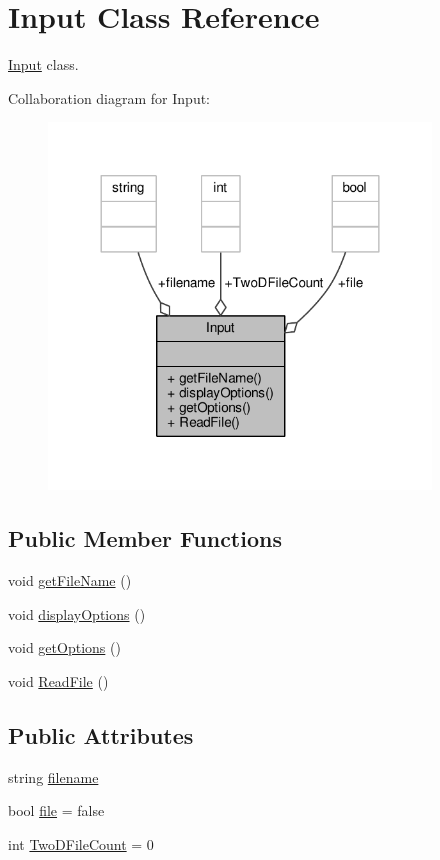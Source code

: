\hypertarget{classInput}{}\section{Input Class Reference}
\label{classInput}


\hyperlink{classInput}{Input} class.  




Collaboration diagram for Input\+:
\nopagebreak
\begin{figure}[H]
\begin{center}
\leavevmode
\includegraphics[width=288pt]{classInput__coll__graph}
\end{center}
\end{figure}
\subsection*{Public Member Functions}
\begin{DoxyCompactItemize}
\item 
void \hyperlink{classInput_abb4311267ded94768e6df9cb88b179bb}{get\+File\+Name} ()
\item 
void \hyperlink{classInput_a29639b68a8a421e0cb1b576eae3f8259}{display\+Options} ()
\item 
void \hyperlink{classInput_af0a5bad322752da31bcd7b1e2d99d611}{get\+Options} ()
\item 
void \hyperlink{classInput_a9d9395f68b01faa00f962791878723a2}{Read\+File} ()
\end{DoxyCompactItemize}
\subsection*{Public Attributes}
\begin{DoxyCompactItemize}
\item 
string \hyperlink{classInput_af296359065236ac9139aab7736d6844d}{filename}
\item 
bool \hyperlink{classInput_ad073fa115ead2e8b7492214215ebd22d}{file} = false
\item 
int \hyperlink{classInput_a82141fe9142aec447f9ef52fd2f78c73}{Two\+D\+File\+Count} = 0
\end{DoxyCompactItemize}


